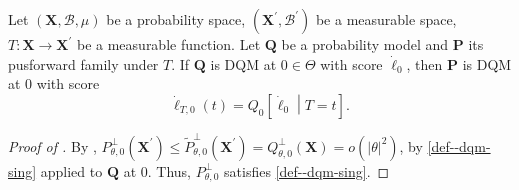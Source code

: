 \begin{theorem}
\label{thm--P-dqm}
Let \((\mathbf{X}, \mathcal{B}, \mu)\) be a probability space, \(\left(
\mathbf{X}^{\prime}, \mathcal{B}^{\prime} \right)\) be a measurable space,
\(T : \mathbf{X} \to \mathbf{X}^{\prime}\) be a measurable function.
Let \(\mathbf{Q}\) be a probability model and \(\mathbf{P}\) its pusforward
family under \(T\).
If \(\mathbf{Q}\) is DQM at \(0 \in \Theta\) with score
\(\dot{\ell}_{0}\), then \(\mathbf{P}\) is DQM at \(0\) with score
\begin{equation}
  \dot{\ell}_{T, 0} (t) = Q_{0} \left[ \dot{\ell}_{0} \middle| T = t \right].
  \label{eqn--dotl-marg-T-def}
\end{equation}
\end{theorem}

\begin{proof}[Proof of ]
By ,
\(P_{\theta, 0}^{\perp} \left( \mathbf{X}^{\prime} \right) \leq
\tilde{P}_{\theta, 0}^{\perp} \left( \mathbf{X}^{\prime} \right) =
Q_{\theta, 0}^{\perp} (\mathbf{X}) = o \left( |\theta|^{2} \right)\), by
 \ref{def--dqm-sing} applied to \(\mathbf{Q}\) at 0.
Thus, \(P_{\theta, 0}^{\perp}\) satisfies
 \ref{def--dqm-sing}.


\end{proof}
